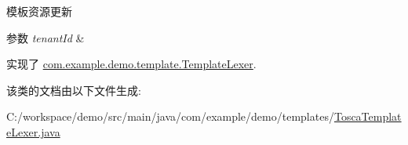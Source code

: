 模板资源更新 
\begin{DoxyParams}{参数}
{\em tenant\+Id} & \\
\hline
\end{DoxyParams}


实现了 \mbox{\hyperlink{interfacecom_1_1example_1_1demo_1_1template_1_1_template_lexer_a83b30db96a9095fe1fa5d9a9040c0ceb}{com.\+example.\+demo.\+template.\+Template\+Lexer}}.



该类的文档由以下文件生成\+:\begin{DoxyCompactItemize}
\item 
C\+:/workspace/demo/src/main/java/com/example/demo/templates/\mbox{\hyperlink{_tosca_template_lexer_8java}{Tosca\+Template\+Lexer.\+java}}\end{DoxyCompactItemize}
